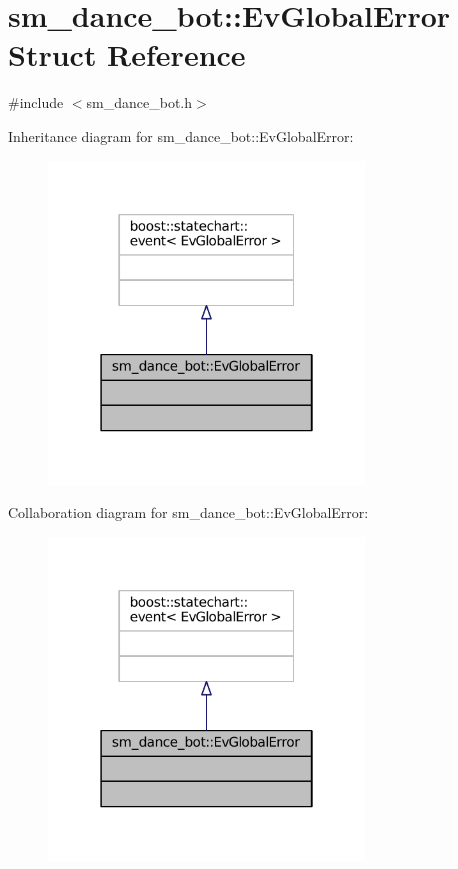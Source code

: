\hypertarget{structsm__dance__bot_1_1EvGlobalError}{}\section{sm\+\_\+dance\+\_\+bot\+:\+:Ev\+Global\+Error Struct Reference}
\label{structsm__dance__bot_1_1EvGlobalError}


{\ttfamily \#include $<$sm\+\_\+dance\+\_\+bot.\+h$>$}



Inheritance diagram for sm\+\_\+dance\+\_\+bot\+:\+:Ev\+Global\+Error\+:
\nopagebreak
\begin{figure}[H]
\begin{center}
\leavevmode
\includegraphics[width=238pt]{structsm__dance__bot_1_1EvGlobalError__inherit__graph}
\end{center}
\end{figure}


Collaboration diagram for sm\+\_\+dance\+\_\+bot\+:\+:Ev\+Global\+Error\+:
\nopagebreak
\begin{figure}[H]
\begin{center}
\leavevmode
\includegraphics[width=238pt]{structsm__dance__bot_1_1EvGlobalError__coll__graph}
\end{center}
\end{figure}


